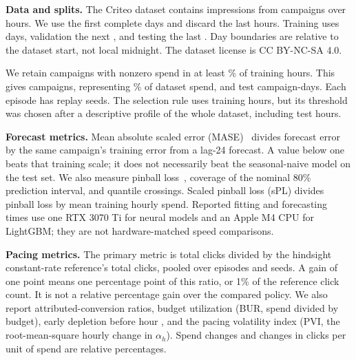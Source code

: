 \documentclass[sigconf,nonacm]{acmart}
\begin{document}
\begin{table}[tb]
  \caption{Original four forecasters: mean test accuracy ($\pm$ training-seed SD). MASE$_h$ is MASE at step $h$; Cov.\ is 80\% prediction-interval coverage. Time includes fitting and forecasting.}
  \label{tab:forecast}
  \small\setlength{\tabcolsep}{3pt}
  \resizebox{\linewidth}{!}{}
\end{table}

\textbf{Data and splits.} The Criteo dataset contains 
impressions from  campaigns over 
hours. We use the first  complete days and discard the last
 hours. Training uses  days,
validation the next , and testing the last
. Day boundaries are relative to the dataset start, not
local midnight. The dataset license is CC BY-NC-SA 4.0.

We retain campaigns with nonzero spend in at least \% of
training hours. This gives  campaigns, representing
\% of dataset spend, and 
test campaign-days. Each episode has  replay seeds. The
selection rule uses training hours, but its threshold was chosen after a
descriptive profile of the whole dataset, including test hours.

\textbf{Forecast metrics.} Mean absolute scaled error
(MASE)~\cite{hyndman2006another} divides forecast error by the same campaign's
training error from a lag-24 forecast. A value below one beats that training
scale; it does not necessarily beat the seasonal-naive model on the test set.
We also measure pinball loss~\cite{koenker1978regression}, coverage of the
nominal 80\% prediction interval, and quantile crossings. Scaled pinball loss
(sPL) divides pinball loss by mean training hourly spend. Reported fitting and
forecasting times use one RTX 3070 Ti for neural models and an Apple M4 CPU for
LightGBM; they are not hardware-matched speed comparisons.

\textbf{Pacing metrics.} The primary metric is total clicks divided by the
hindsight constant-rate reference's total clicks, pooled over episodes and
seeds. A gain of one point means one percentage point of this ratio, or 1\%
of the reference click count. It is not a relative percentage gain over the
compared policy. We also report attributed-conversion ratios, budget utilization
(BUR, spend divided by budget), early depletion before hour
, and the pacing volatility index (PVI, the root-mean-square
hourly change in $\alpha_h$). Spend changes and changes in clicks per unit of
spend are relative percentages.
\end{document}
